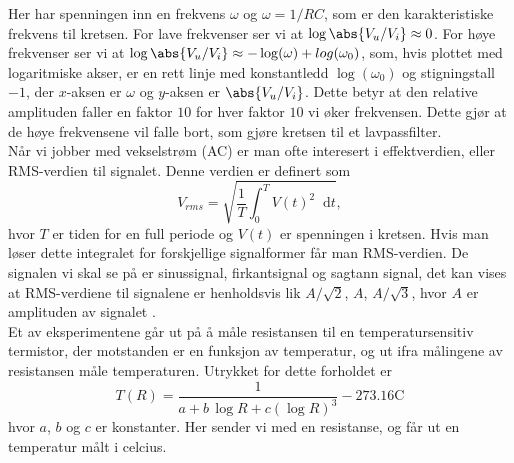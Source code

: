 \documentclass[%
 reprint,
 amsmath,amssymb,
 aps,
]{revtex4-1}
\newcommand*\diff{\mathop{}\!\mathrm{d}}
\begin{document}
Her har spenningen inn en frekvens $\omega$ og $\omega = 1/RC$, som er den karakteristiske frekvens til kretsen. For lave frekvenser ser vi at $\log\abs{V_u/V_i}\approx 0$. For høye frekvenser ser vi at $\log\abs{V_u/V_i}\approx -\log(\omega) + log(\omega_0)$, som, hvis plottet med logaritmiske akser, er en rett linje med konstantledd $\log(\omega_0)$ og stigningstall $-1$, der $x$-aksen er $\omega$ og $y$-aksen er $\abs{V_u/V_i}$. Dette betyr at den relative amplituden faller en faktor $10$ for hver faktor $10$ vi øker frekvensen. Dette gjør at de høye frekvensene vil falle bort, som gjøre kretsen til et lavpassfilter.
\\
Når vi jobber med vekselstrøm (AC) er man ofte interesert i effektverdien, eller RMS-verdien til signalet. Denne verdien er definert som
\begin{equation}
  V_{rms} = \sqrt{\frac{1}{T} \int_0^T V(t)^2 \diff t} \label{rms},
\end{equation}hvor $T$ er tiden for en full periode og $V(t)$ er spenningen i kretsen. Hvis man løser dette integralet for forskjellige signalformer får man RMS-verdien. De signalen vi skal se på er sinussignal, firkantsignal og sagtann signal, det kan vises at RMS-verdiene til signalene er henholdsvis lik $A/\sqrt{2}$, $A$, $A/\sqrt{3}$, hvor $A$ er amplituden av signalet \cite{rms_wiki}.
\\
Et av eksperimentene går ut på å måle resistansen til en temperatursensitiv termistor, der motstanden er en funksjon av temperatur, og ut ifra målingene av resistansen måle temperaturen. Utrykket for dette forholdet er
\begin{equation}
  T(R) = \frac{1}{a+b\, \log R + c \left(\log R\right)^3} - 273.16 \text{C} \label{calc_temp}
\end{equation}hvor $a$, $b$ og $c$ er konstanter. Her sender vi med en resistanse, og får ut en temperatur målt i celcius.
\end{document}
